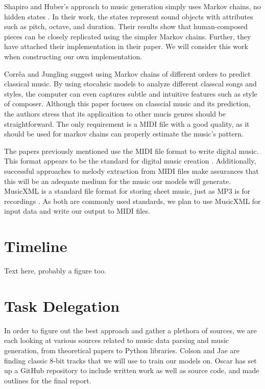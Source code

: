 \documentclass{article}
\begin{document}
Shapiro and Huber's approach to music generation simply uses Markov chains, no hidden states \cite{shapiro_huber_2021}. In their work, the states represent sound 
objects with attributes such as pitch, octave, and duration. Their results show that human-composed pieces can be closely replicated using the simpler Markov chains. 
Further, they have attached their implementation in their paper. We will consider this work when constructing our own implementation.

Corrêa and Jungling suggest using Markov chains of different orders to predict classical music. By using stocahsic models to analyze different classcal songs and styles,
the computer can even captures subtle and intuitive features such as style of composer. Although this paper focuses on classcial music and its prediction, the authors stress
that its applicaition to other mucis genres should be straightforward. The only requirement is a MIDI file with a good quality, as it should be used for markov chains can 
properly estimate the music's pattern.

The papers previously mentioned use the MIDI file format to write digital music. This format appears to be the standard for digital music creation \cite{midi_format}. 
Additionally, successful approaches to melody extraction from MIDI files \cite{ozcan_2005} make assurances that this will be an adequate medium for the music our models 
will generate. MusicXML is a standard file format for storing sheet music, just as MP3 is for recordings \cite{musicxml_2022}. As both are commonly used standards, we 
plan to use MusicXML for input data and write our output to MIDI files.

\section{Timeline}
Text here, probably a figure too. 

\section{Task Delegation}
In order to figure out the best approach and gather a plethora of sources, we are each looking at various sources related to music data parsing and music generation, 
from theoretical papers to Python libraries. Colson and Jae are finding classic 8-bit tracks that we will use to train our models on. Oscar has set up a GitHub repository 
to include written work as well as source code, and made outlines for the final report. 
\end{document}
